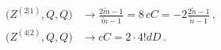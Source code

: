 \begin{equation}
\label{e:mnrel}
\begin{aligned}
\big( Z^{(2|1)}, Q, Q \big) &\rightarrow \frac{2\tilde m-1}{\tilde
m-1} = 8\,cC = -2\frac{2\tilde n-1}{\tilde n-1}\, ,\\[1ex]
\big( Z^{(4|2)}, Q, Q \big) &\rightarrow cC = 2\cdot 4! dD\, .
\end{aligned}
\end{equation}

